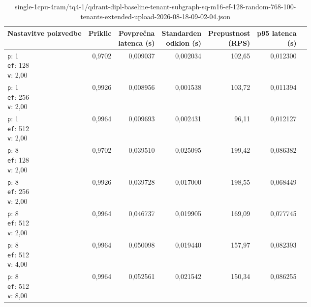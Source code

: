 \begin{table}[htbp]
  \centering
\small
  \caption{single-1cpu-4ram/tq4-1/qdrant-dipl-baseline-tenant-subgraph-sq-m16-ef-128-random-768-100-tenants-extended-upload-2026-08-18-09-02-04.json}
  \label{tab:single-1cpu-4ram:tq4-1:qdrant-dipl-baseline-tenant-subgraph-sq-m16-ef-128-random-768-100-tenants-extended-upload-2026-08-18-09-02-04.json}
  \begin{tabularx}{\textwidth}{Xrrrrrr}
    \toprule
    Nastavitve poizvedbe & Priklic & \makecell{Povprečna\\latenca (s)} & \makecell{Standarden\\odklon (s)} & \makecell{Prepustnost\\(RPS)} & \makecell{p95 latenca\\(s)}  \\
    \midrule
    \makecell{\texttt{p}: 1\\\texttt{ef}: 128\\\texttt{v}: 2,00} & 0,9702 & 0,009037 & 0,002034 & 102,65 & 0,012300 \\
    \makecell{\texttt{p}: 1\\\texttt{ef}: 256\\\texttt{v}: 2,00} & 0,9926 & 0,008956 & 0,001538 & 103,72 & 0,011394 \\
    \makecell{\texttt{p}: 1\\\texttt{ef}: 512\\\texttt{v}: 2,00} & 0,9964 & 0,009693 & 0,002431 & 96,11 & 0,012127 \\
    \makecell{\texttt{p}: 8\\\texttt{ef}: 128\\\texttt{v}: 2,00} & 0,9702 & 0,039510 & 0,025095 & 199,42 & 0,086382 \\
    \makecell{\texttt{p}: 8\\\texttt{ef}: 256\\\texttt{v}: 2,00} & 0,9926 & 0,039728 & 0,017000 & 198,55 & 0,068449 \\
    \makecell{\texttt{p}: 8\\\texttt{ef}: 512\\\texttt{v}: 2,00} & 0,9964 & 0,046737 & 0,019905 & 169,09 & 0,077745 \\
    \makecell{\texttt{p}: 8\\\texttt{ef}: 512\\\texttt{v}: 4,00} & 0,9964 & 0,050098 & 0,019440 & 157,97 & 0,082393 \\
    \makecell{\texttt{p}: 8\\\texttt{ef}: 512\\\texttt{v}: 8,00} & 0,9964 & 0,052561 & 0,021542 & 150,34 & 0,086255 \\

\end{tabularx}
\end{table}
